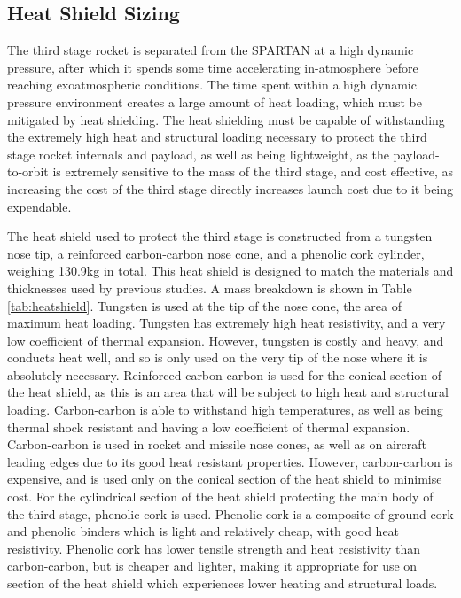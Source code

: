\subsection{Heat Shield Sizing}

The third stage rocket is separated from the SPARTAN at a high dynamic pressure, after which it spends some time accelerating in-atmosphere before reaching exoatmospheric conditions. The time spent within a high dynamic pressure environment creates a large amount of heat loading, which must be mitigated by heat shielding. The heat shielding must be capable of withstanding the extremely high heat and structural loading necessary to protect the third stage rocket internals and payload, as well as being lightweight, as the payload-to-orbit is extremely sensitive to the mass of the third stage, and cost effective, as increasing the cost of the third stage directly increases launch cost due to it being expendable. 


The heat shield used to protect the third stage is constructed from a tungsten nose tip, a reinforced carbon-carbon nose cone, and a phenolic cork cylinder, weighing 130.9kg in total. This heat shield is designed to match the materials and thicknesses used by previous studies\cite{Preller2017b}. A mass breakdown is shown in Table \ref{tab:heatshield}.
Tungsten is used at the tip of the nose cone, the area of maximum heat loading. Tungsten has extremely high heat resistivity, and a very low coefficient of thermal expansion\cite{tungsten}. However, tungsten is costly and heavy, and conducts heat well, and so is only used on the very tip of the nose where it is absolutely necessary. 
  Reinforced carbon-carbon is used for the conical section of the heat shield, as this is an area that will be subject to high heat and structural loading. Carbon-carbon is able to withstand high temperatures, as well as being thermal shock resistant and having a low coefficient of thermal expansion\cite{Fitzer}. Carbon-carbon is used in rocket and missile nose cones, as well as on aircraft leading edges due to its good heat resistant properties\cite{Fitzer}. However, carbon-carbon is expensive, and is used only on the conical section of the heat shield to minimise cost. For the cylindrical section of the heat shield protecting the main body of the third stage, phenolic cork is used. Phenolic cork is a composite of ground cork and phenolic binders which is light and relatively cheap, with good heat resistivity. Phenolic cork has lower tensile strength and heat resistivity than carbon-carbon\cite{Composites,Fitzer}, but is cheaper and lighter, making it appropriate for use on section of the heat shield which experiences lower heating and structural loads. 

